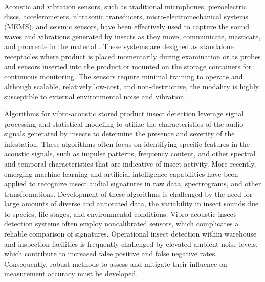 Acoustic and vibration sensors, such as traditional microphones, piezoelectric discs, accelerometers, ultrasonic transducers, micro-electromechanical systems (MEMS), and seismic sensors, have been effectively used to capture the sound waves and vibrations generated by insects as they move, communicate, masticate, and procreate in the material \cite{mankinPerspectivePromiseCentury2011}. These systems are designed as standalone receptacles where product is placed momentarily during examination or as probes and sensors inserted into the product or mounted on the storage containers for continuous monitoring. The sensors require minimal training to operate and although scalable, relatively low-cost, and non-destructive, the modality is highly susceptible to external environmental noise and vibration. 

Algorithms for vibro-acoustic stored product insect detection leverage signal processing and statistical modeling to utilize the characteristics of the audio signals generated by insects to determine the presence and severity of the infestation. These algorithms often focus on identifying specific features in the acoustic signals, such as impulse patterns, frequency content, and other spectral and temporal characteristics that are indicative of insect activity. More recently, emerging machine learning and artificial intelligence capabilities have been applied to recognize insect audial signatures in raw data, spectrograms, and other transformations. Development of these algorithms is challenged by the need for large amounts of diverse and annotated data, the variability in insect sounds due to species, life stages, and environmental conditions. Vibro-acoustic insect detection systems often employ noncalibrated sensors, which complicates a reliable comparison of signatures. Operational insect detection within warehouse and inspection facilities is frequently challenged by elevated ambient noise levels, which contribute to increased false positive and false negative rates. Consequently, robust methods to assess and mitigate their influence on measurement accuracy must be developed. 



